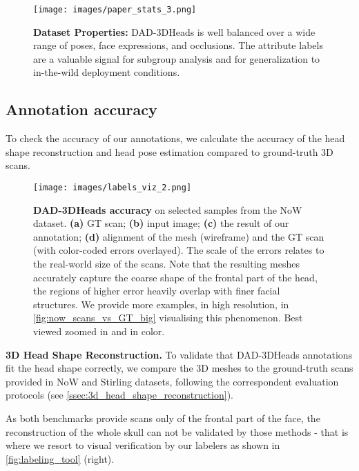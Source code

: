 \documentclass[10pt,twocolumn,letterpaper]{article}
\begin{document}
\begin{figure}[t]
\texttt{[image: images/paper\_stats\_3.png]}
\centering
\caption{\textbf{Dataset Properties:} DAD-3DHeads is well balanced over a wide range of poses, face expressions, and occlusions. The attribute labels are a valuable signal for subgroup analysis and for generalization to in-the-wild deployment conditions.}
\label{fig:dataset_stats}
\end{figure}

\subsection{Annotation accuracy}\label{ssec:accuracy_labels}



To check the accuracy of our annotations, we calculate the accuracy of the head shape reconstruction and head pose estimation compared to ground-truth 3D scans. 

\begin{figure*}[t!]\centering
  \texttt{[image: images/labels\_viz\_2.png]}
  \vspace{1mm}
  \caption{\textbf{DAD-3DHeads accuracy} on selected samples from the NoW dataset. \textbf{(a)} GT scan; \textbf{(b)} input image; \textbf{(c)} the result of our annotation; \textbf{(d)} alignment of the mesh (wireframe) and the GT scan (with color-coded errors overlayed). 
  The scale of the errors relates to the real-world size of the scans. 
  Note that the resulting meshes accurately capture the coarse shape of the frontal part of the head,  
  the regions of higher error heavily overlap with finer facial structures. We provide more examples, in high resolution, in \cref{fig:now_scans_vs_GT_big} visualising this phenomenon. Best viewed zoomed in and in color.}
\label{fig:now_GT_vis}
\end{figure*}

\textbf{3D Head Shape Reconstruction.} To validate that DAD-3DHeads annotations fit the head shape correctly, we compare the 3D meshes to the ground-truth scans provided in NoW \cite{RingNet} and Stirling \cite{Stirling} datasets, following the correspondent evaluation protocols (see \cref{ssec:3d_head_shape_reconstruction}).


As both benchmarks provide scans only of the frontal part of the face, the reconstruction of the whole skull can not be validated by those methods - that is where we resort to visual verification by our labelers as shown in \cref{fig:labeling_tool} (right).
\end{document}
